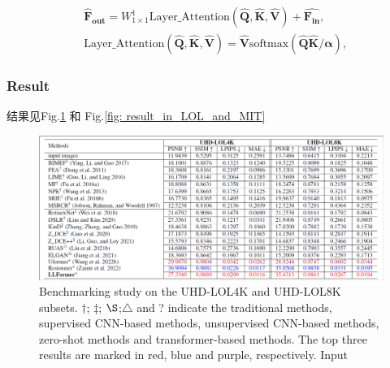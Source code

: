 \documentclass[letterpaper,10pt]{article}
\begin{document}
	\begin{equation}
		\begin{aligned}
			& \hat{\mathbf{F}}_{\mathbf{out}} = W_{1\times1}^1 \text{Layer\_Attention}(\hat{\mathbf{Q}}, \hat{\mathbf{K}}, \hat{\mathbf{V}}) + \hat{\mathbf{F}_{\mathbf{in}}},\\ 
			& \text{Layer\_Attention}(\hat{\mathbf{Q}}, \hat{\mathbf{K}}, \hat{\mathbf{V}}) = \hat{\mathbf{V}}\text{softmax}\left(\hat{\mathbf{Q}}\hat{\mathbf{K}}/\mathbf{\alpha}\right), 
		\end{aligned}
		\label{eq: DGFN}
	\end{equation}
	
	\subsubsection{Result}
	
	结果见Fig.\ref{fig: result_in_UHD-LOL} 和 Fig.\ref{fig: result_in_LOL_and_MIT}
	
	\begin{figure}[htbp]
		\centering 
		\includegraphics[width=\columnwidth]{picture/Results_on_UHD-LOL}
		\captionsetup{font=scriptsize}
		\caption{
			\label{fig: result_in_UHD-LOL} %
			Benchmarking study on the UHD-LOL4K and UHD-LOL8K subsets. $\dag$; $\ddag$; $\S$;$\triangle$ and ? indicate the traditional methods, supervised CNN-based methods, unsupervised CNN-based methods, zero-shot methods and transformer-based methods. The top three results are marked in red, blue and purple, respectively.
			Input
		}
	\end{figure}
	
\end{document}
